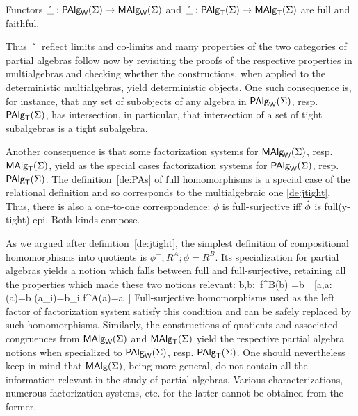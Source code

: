 \documentclass[10pt]{article}
\begin{document}
\begin{Fact}
\label{fa:faith} 
Functors $\hat{\_}:\mbox{\rm\sf PAlg}_{\sf W}(\Sigma)\rightarrow\mbox{\rm\sf MAlg}_{\sf W}(\Sigma)$ and $\hat{\_}:\mbox{\rm\sf PAlg}_{\sf T}(\Sigma)\rightarrow\mbox{\rm\sf MAlg}_{\sf T}(\Sigma)$ 
are full and faithful.
\end{Fact}

\noindent
Thus $\hat{\_}$ reflect limits and co-limits and many properties of the
two categories of partial algebras follow now by revisiting the proofs
of the respective properties in multialgebras and checking whether the
constructions, when applied to the deterministic multialgebras, yield
deterministic objects.  One such consequence is, for instance, that
any set of subobjects of any algebra in $\mbox{\rm\sf PAlg}_{\sf W}(\Sigma)$, resp. $\mbox{\rm\sf PAlg}_{\sf T}(\Sigma)$, has
intersection, in particular, that intersection of a set of tight
subalgebras is a tight subalgebra.


Another consequence 
is that some factorization systems for $\mbox{\rm\sf MAlg}_{\sf W}(\Sigma)$, resp. $\mbox{\rm\sf MAlg}_{\sf T}(\Sigma)$,
yield as the special cases factorization systems for $\mbox{\rm\sf PAlg}_{\sf W}(\Sigma)$, resp. $\mbox{\rm\sf PAlg}_{\sf T}(\Sigma)$.
The definition~\ref{de:PAs} of full homomorphisms is a special case of the
relational definition and so corresponds to the multialgebraic one
\ref{de:jtight}.  Thus, there is also a one-to-one correspondence:
$\phi$ is full-surjective iff $\hat{\phi}$ is full(y-tight) epi.  
Both kinds compose.

As we argued after definition~\ref{de:jtight}, 
the simplest definition of compositional homomorphisms into quotients is
$\phi^-;R^A;\phi=R^B$.
Its specialization for partial algebras yields a notion 
which falls between full and full-surjective, 
retaining all the properties which made these two notions relevant:
\eq
{ \forall \lis b,b:\ f^B(\lis b) =b\
\Iff\ [\exists \lis a,a: \phi(a)=b \land \phi(a_i)=b_i
  \land f^A(\lis a)=a\ ]
\label{eq:ftsPA}
}
Full-surjective homomorphisms used as the left factor of factorization system
satisfy this condition and can be safely replaced by such homomorphisms.
Similarly, the constructions of quotients and associated congruences
from $\mbox{\rm\sf MAlg}_{\sf W}(\Sigma)$ and $\mbox{\rm\sf MAlg}_{\sf T}(\Sigma)$ yield the respective partial algebra 
notions when specialized to $\mbox{\rm\sf PAlg}_{\sf W}(\Sigma)$, resp. $\mbox{\rm\sf PAlg}_{\sf T}(\Sigma)$.
One should nevertheless keep in mind that $\mbox{\rm\sf MAlg}(\Sigma)$, being more general, do not contain all
the information relevant in the study of partial algebras. Various characterizations, 
numerous factorization systems, etc. for the latter cannot be obtained from the former.
\end{document}

